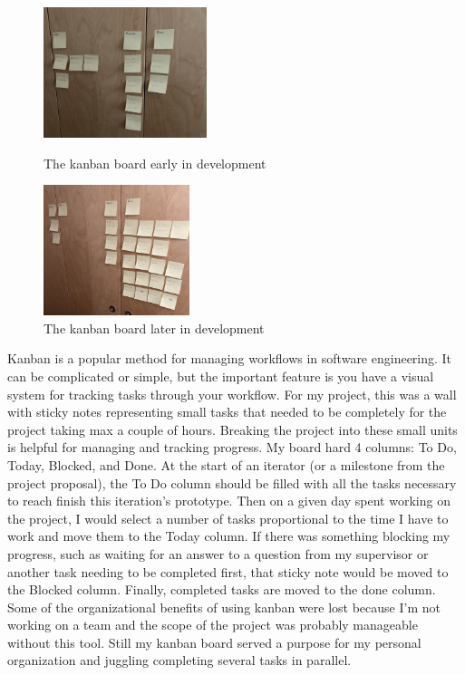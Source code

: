 \documentclass[12pt,a4paper,twoside,openright]{report}
\begin{document}
\begin{figure}[H]
   \centering
   \begin{minipage}{0.45\textwidth}
      \centering
      \includegraphics[height=1.5in]{kanban-early}
      \caption{The kanban board early in development}
   \end{minipage}\hfill
   \begin{minipage}{0.45\textwidth}
      \centering
      \includegraphics[height=1.5in]{kanban-late}
      \caption{The kanban board later in development}
   \end{minipage}
\end{figure}
Kanban is a popular method for managing workflows in software engineering.
It can be complicated or simple, but the important feature is you have a visual system for tracking tasks through your workflow.
For my project, this was a wall with sticky notes representing small tasks that needed to be completely for the project taking max a couple of hours.
Breaking the project into these small units is helpful for managing and tracking progress.
My board hard 4 columns: To Do, Today, Blocked, and Done.
At the start of an iterator (or a milestone from the project proposal), the To Do column should be filled with all the tasks necessary to reach finish this iteration's prototype.
Then on a given day spent working on the project, I would select a number of tasks proportional to the time I have to work and move them to the Today column.
If there was something blocking my progress, such as waiting for an answer to a question from my supervisor or another task needing to be completed first, that sticky note would be moved to the Blocked column.
Finally, completed tasks are moved to the done column.
Some of the organizational benefits of using kanban were lost because I'm not working on a team and the scope of the project was probably manageable without this tool.
Still my kanban board served a purpose for my personal organization and juggling completing several tasks in parallel.
\end{document}
